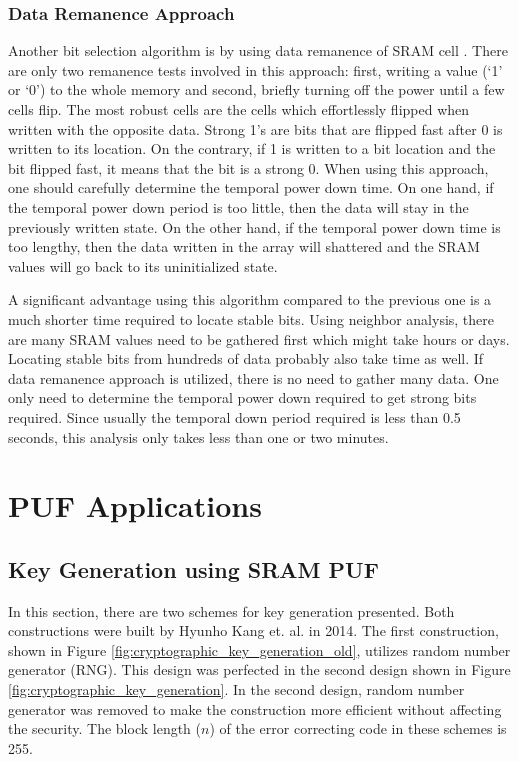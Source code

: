 \subsubsection{Data Remanence Approach}

Another bit selection algorithm is by using data remanence of SRAM cell \cite{liu_zhou_tang_parhi_kim_2017}.
There are only two remanence tests involved in this approach: first, writing a value (‘1’ or ‘0’) to the whole memory and second, briefly turning off the power until a few cells flip. The most robust cells are the cells which effortlessly flipped when written with the opposite data. Strong 1's are bits that are flipped fast after 0 is written to its location. On the contrary, if 1 is written to a bit location and the bit flipped fast, it means that the bit is a strong 0.
When using this approach, one should carefully determine the temporal power down time. On one hand, if the temporal power down period is too little, then the data will stay in the previously written state. On the other hand, if the temporal power down time is too lengthy, then the data written in the array will shattered and the SRAM values will go back to its uninitialized state.

A significant advantage using this algorithm compared to the previous one is a much shorter time required to locate stable bits. Using neighbor analysis, there are many SRAM values need to be gathered first which might take hours or days. Locating stable bits from hundreds of data probably also take time as well. If data remanence approach is utilized, there is no need to gather many data. One only need to determine the temporal power down required to get strong bits required. Since usually the temporal down period required is less than 0.5 seconds, this analysis only takes less than one or two minutes.

\section{PUF Applications}

\subsection{Key Generation using SRAM PUF}

In this section, there are two schemes for key generation presented. Both constructions were built by Hyunho Kang et. al. in 2014. The first construction, shown in Figure \ref{fig:cryptographic_key_generation_old}, utilizes random number generator (RNG). This design was perfected in the second design shown in Figure \ref{fig:cryptographic_key_generation}. In the second design, random number generator was removed to make the construction more efficient without affecting the security.
The block length ($n$) of the error correcting code in these schemes is 255.

